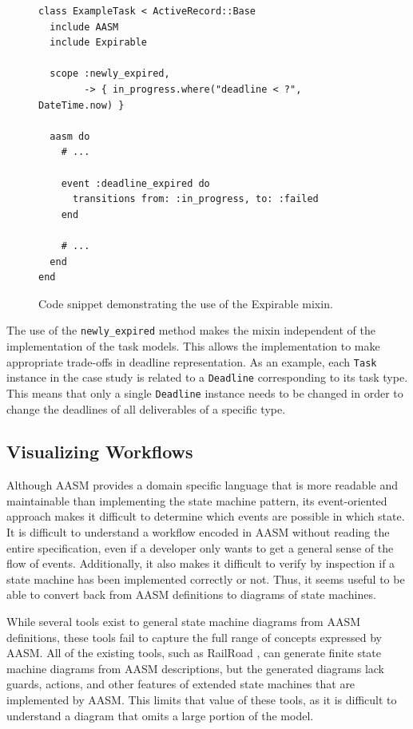 \documentclass[document.tex]{subfiles}
\begin{document}
\begin{figure}[!ht]
  \begin{lstlisting}
class ExampleTask < ActiveRecord::Base
  include AASM
  include Expirable

  scope :newly_expired,
        -> { in_progress.where("deadline < ?", DateTime.now) }

  aasm do
    # ...

    event :deadline_expired do
      transitions from: :in_progress, to: :failed
    end

    # ...
  end
end
  \end{lstlisting}
  \caption{Code snippet demonstrating the use of the Expirable mixin.}
  \label{fig:deadline-expiration-example}
\end{figure}

The use of the \verb!newly_expired! method makes the mixin independent of the implementation of the task models. This allows the implementation to make appropriate trade-offs in deadline representation. As an example, each \verb!Task! instance in the case study is related to a \verb!Deadline! corresponding to its task type. This means that only a single \verb!Deadline! instance needs to be changed in order to change the deadlines of all deliverables of a specific type.

\FloatBarrier


\subsection {Visualizing Workflows}
\label {sec:4ys-visualizing-workflows}

Although AASM provides a domain specific language that is more readable and maintainable than implementing the state machine pattern, its event-oriented approach makes it difficult to determine which events are possible in which state. It is difficult to understand a workflow encoded in AASM without reading the entire specification, even if a developer only wants to get a general sense of the flow of events. Additionally, it also makes it difficult to verify by inspection if a state machine has been implemented correctly or not. Thus, it seems useful to be able to convert back from AASM definitions to diagrams of state machines.

While several tools exist to general state machine diagrams from AASM definitions, these tools fail to capture the full range of concepts expressed by AASM. All of the existing tools, such as RailRoad \cite{railroad}, can generate finite state machine diagrams from AASM descriptions, but the generated diagrams lack guards, actions, and other features of extended state machines that are implemented by AASM. This limits that value of these tools, as it is difficult to understand a diagram that omits a large portion of the model.
\end{document}
